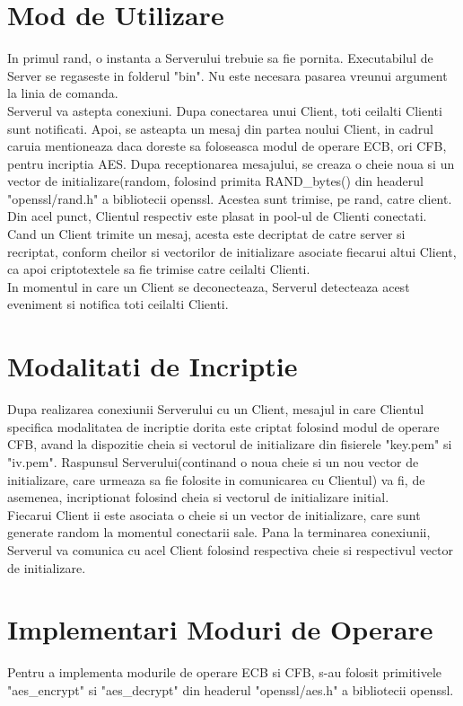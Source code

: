 \documentclass{article}
\begin{document}
\section{Mod de Utilizare}
In primul rand, o instanta a Serverului trebuie sa fie pornita. Executabilul de Server se regaseste in folderul "bin". Nu este necesara pasarea vreunui argument la linia de comanda. \\
Serverul va astepta conexiuni. Dupa conectarea unui Client, toti ceilalti Clienti sunt notificati. Apoi, se asteapta un mesaj din partea noului Client, in cadrul caruia mentioneaza daca doreste sa foloseasca modul de operare ECB, ori CFB, pentru incriptia AES. Dupa receptionarea mesajului, se creaza o cheie noua si un vector de initializare(random, folosind primita RAND\_bytes() din headerul "openssl/rand.h" a bibliotecii openssl. Acestea sunt trimise, pe rand, catre client. Din acel punct, Clientul respectiv este plasat in pool-ul de Clienti conectati. \\
Cand un Client trimite un mesaj, acesta este decriptat de catre server si recriptat, conform cheilor si vectorilor de initializare asociate fiecarui altui Client, ca apoi criptotextele sa fie trimise catre ceilalti Clienti. \\
In momentul in care un Client se deconecteaza, Serverul detecteaza acest eveniment si notifica toti ceilalti Clienti.


\section{Modalitati de Incriptie}
Dupa realizarea conexiunii Serverului cu un Client, mesajul in care Clientul specifica modalitatea de incriptie dorita este criptat folosind modul de operare CFB, avand la dispozitie cheia si vectorul de initializare din fisierele "key.pem" si "iv.pem". Raspunsul Serverului(continand o noua cheie si un nou vector de initializare, care urmeaza sa fie folosite in comunicarea cu Clientul) va fi, de asemenea, incriptionat folosind cheia si vectorul de initializare initial. \\
Fiecarui Client ii este asociata o cheie si un vector de initializare, care sunt generate random la momentul conectarii sale. Pana la terminarea conexiunii, Serverul va comunica cu acel Client folosind respectiva cheie si respectivul vector de initializare.


\section{Implementari Moduri de Operare}
Pentru a implementa modurile de operare ECB si CFB, s-au folosit primitivele "aes\_encrypt" si "aes\_decrypt" din headerul "openssl/aes.h" a bibliotecii openssl.
\end{document}
